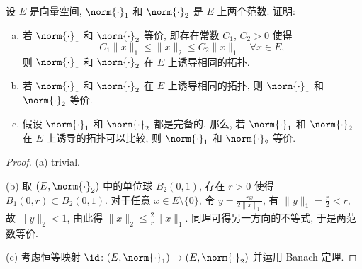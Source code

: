 \begin{exercise}
  设 $E$ 是向量空间, $\norm{\cdot}_1$ 和 $\norm{\cdot}_2$ 是 $E$ 上两个范数. 证明:
  \begin{enumerate}[(a)]
    \item 若 $\norm{\cdot}_1$ 和 $\norm{\cdot}_2$ 等价, 即存在常数 $C_1$, $C_2>0$ 使得
      \[C_1\|x\|_1 \leq \|x\|_2 \leq C_2\|x\|_1\quad\forall x\in E,\]
      则 $\norm{\cdot}_1$ 和 $\norm{\cdot}_2$ 在 $E$ 上诱导相同的拓扑.
    \item 若 $\norm{\cdot}_1$ 和 $\norm{\cdot}_2$ 在 $E$ 上诱导相同的拓扑, 则 $\norm{\cdot}_1$
      和 $\norm{\cdot}_2$ 等价.
    \item 假设 $\norm{\cdot}_1$ 和 $\norm{\cdot}_2$ 都是完备的. 那么, 若 $\norm{\cdot}_1$
      和 $\norm{\cdot}_2$ 在 $E$ 上诱导的拓扑可以比较, 则 $\norm{\cdot}_1$ 和 $\norm{\cdot}_2$ 等价.
  \end{enumerate}
\end{exercise}

\begin{proof}
  (a) trivial.

  (b) 取 $(E,\norm{\cdot}_2)$ 中的单位球 $B_2(0,1)$, 存在 $r>0$
  使得 $B_1(0,r)\subset B_2(0,1)$.
  对于任意 $x\in E\setminus\{0\}$, 令 $y = \frac{rx}{2\|x\|_1}$, 有
  $\|y\|_1 = \frac{r}{2} < r$, 故 $\|y\|_2 < 1$, 由此得 $\|x\|_2\leq\frac{2}{r}\|x\|_1$.
  同理可得另一方向的不等式, 于是两范数等价.

  (c) 考虑恒等映射 $\id\colon (E,\norm{\cdot}_1)\to (E,\norm{\cdot}_2)$
  并运用 Banach 定理.
\end{proof}